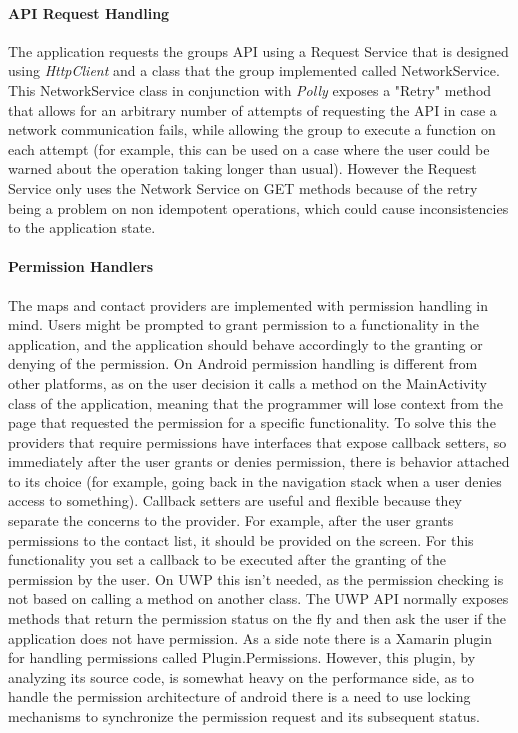 \paragraph{API Request Handling}

The application requests the groups API using a Request Service that is designed using \textit{HttpClient} and a class that the group implemented called NetworkService. This NetworkService class in conjunction with \textit{Polly} exposes a "Retry" method that allows for an arbitrary number of attempts of requesting the API in case a network communication fails, while allowing the group to execute a function on each attempt (for example, this can be used on a case where the user could be warned about the operation taking longer than usual). However the Request Service only uses the Network Service on GET methods because of the retry being a problem on non idempotent operations, which could cause inconsistencies to the application state.

\paragraph{Permission Handlers}

The maps and contact providers are implemented with permission handling in mind. Users might be prompted to grant permission to a functionality in the application, and the application should behave accordingly to the granting or denying of the permission.
On Android permission handling is different from other platforms, as on the user decision it calls a method on the MainActivity class of the application, meaning that the programmer will lose context from the page that requested the permission for a specific functionality.
To solve this the providers that require permissions have interfaces that expose callback setters, so immediately after the user grants or denies permission, there is behavior attached to its choice (for example, going back in the navigation stack when a user denies access to something).
Callback setters are useful and flexible because they separate the concerns to the provider. For example, after the user grants permissions to the contact list, it should be provided on the screen. For this functionality you set a callback to be executed after the granting of the permission by the user.
On UWP this isn’t needed, as the permission checking is not based on calling a method on another class. The UWP API normally exposes methods that return the permission status on the fly and then ask the user if the application does not have permission.
As a side note there is a Xamarin plugin for handling permissions called Plugin.Permissions. However, this plugin, by analyzing its source code, is somewhat heavy on the performance side, as to handle the permission architecture of android there is a need to use locking mechanisms to synchronize the permission request and its subsequent status.


